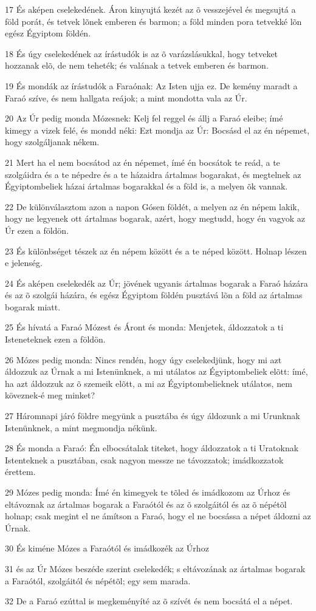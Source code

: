 \par 17 És aképen cselekedének. Áron kinyujtá kezét az õ vesszejével és megsujtá a föld porát, és tetvek lõnek emberen és barmon; a föld minden pora tetvekké lõn egész Égyiptom földén.
\par 18 És úgy cselekedének az írástudók is az õ varázslásukkal, hogy tetveket hozzanak elõ, de nem teheték; és valának a tetvek emberen és barmon.
\par 19 És mondák az írástudók a Faraónak: Az Isten ujja ez. De kemény maradt a Faraó szíve, és nem hallgata reájok; a mint mondotta vala az Úr.
\par 20 Az Úr pedig monda Mózesnek: Kelj fel reggel és állj a Faraó eleibe; ímé kimegy a vizek felé, és mondd néki: Ezt mondja az Úr: Bocsásd el az én népemet, hogy szolgáljanak nékem.
\par 21 Mert ha el nem bocsátod az én népemet, ímé én bocsátok te reád, a te szolgáidra és a te népedre és a te házaidra ártalmas bogarakat, és megtelnek az Égyiptombeliek házai ártalmas bogarakkal és a föld is, a melyen õk vannak.
\par 22 De különválasztom azon a napon Gósen földét, a melyen az én népem lakik, hogy ne legyenek ott ártalmas bogarak, azért, hogy megtudd, hogy én vagyok az Úr ezen a földön.
\par 23 És különbséget tészek az én népem között és a te néped között. Holnap lészen e jelenség.
\par 24 És aképen cselekedék az Úr; jövének ugyanis ártalmas bogarak a Faraó házára és az õ szolgái házára, és egész Égyiptom földén pusztává lõn a föld az ártalmas bogarak miatt.
\par 25 És hívatá a Faraó Mózest és Áront és monda: Menjetek, áldozzatok a ti Isteneteknek ezen a földön.
\par 26 Mózes pedig monda: Nincs rendén, hogy úgy cselekedjünk, hogy mi azt áldozzuk az Úrnak a mi Istenünknek, a mi utálatos az Égyiptombeliek elõtt: ímé, ha azt áldozzuk az õ szemeik elõtt, a mi az Égyiptombelieknek utálatos, nem köveznek-é meg minket?
\par 27 Háromnapi járó földre megyünk a pusztába és úgy áldozunk a mi Urunknak Istenünknek, a mint megmondja nékünk.
\par 28 És monda a Faraó: Én elbocsátalak titeket, hogy áldozzatok a ti Uratoknak Istenteknek a pusztában, csak nagyon messze ne távozzatok; imádkozzatok érettem.
\par 29 Mózes pedig monda: Ímé én kimegyek te tõled és imádkozom az Úrhoz és eltávoznak az ártalmas bogarak a Faraótól és az õ szolgáitól és az õ népétõl holnap; csak megint el ne ámítson a Faraó, hogy el ne bocsássa a népet áldozni az Úrnak.
\par 30 És kiméne Mózes a Faraótól és imádkozék az Úrhoz
\par 31 és az Úr Mózes beszéde szerint cselekedék; s eltávozának az ártalmas bogarak a Faraótól, szolgáitól és népétõl; egy sem marada.
\par 32 De a Faraó ezúttal is megkeményíté az õ szívét és nem bocsátá el a népet.

